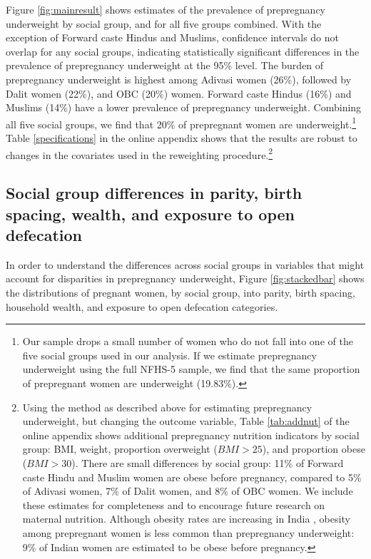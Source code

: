 \documentclass[12pt]{article}
\begin{document}
Figure \ref{fig:mainresult} shows estimates of the prevalence of prepregnancy underweight by social group, and for all five groups combined. With the exception of Forward caste Hindus and Muslims, confidence intervals do not overlap for any social groups, indicating statistically significant differences in the prevalence of prepregnancy underweight at the 95\% level. The burden of prepregnancy underweight is highest among Adivasi women (26\%), followed by Dalit women (22\%), and OBC (20\%) women.  Forward caste Hindus (16\%) and Muslims (14\%) have a lower prevalence of prepregnancy underweight. Combining all five social groups, we find that 20\% of prepregnant women are underweight.\footnote{Our sample drops a small number of women who do not fall into one of the five social groups used in our analysis.  If we estimate prepregnancy underweight using the full NFHS-5 sample, we find that the same proportion of prepregnant women are underweight (19.83\%).} Table \ref{specifications} in the online appendix shows that the results are robust to changes in the covariates used in the reweighting procedure.\footnote{Using the method as described above for estimating prepregnancy underweight, but changing the outcome variable, Table \ref{tab:addnut} of the online appendix shows additional prepregnancy nutrition indicators by social group: BMI, weight, proportion overweight ($BMI>25$), and proportion obese ($BMI>30$).  There are small differences by social group: 11\% of Forward caste Hindu and Muslim women are obese before pregnancy, compared to 5\% of Adivasi women, 7\% of Dalit women, and 8\% of OBC women.  We include these estimates for completeness and to encourage future research on maternal nutrition. Although obesity rates are increasing in India \citep{luhar2020forecasting}, obesity among prepregnant women is less common than prepregnancy underweight: 9\% of Indian women are estimated to be obese before pregnancy.}  

\subsection*{Social group differences in parity, birth spacing, wealth, and exposure to open defecation}

In order to understand the differences across social groups in variables that might account for disparities in prepregnancy underweight, Figure \ref{fig:stackedbar} shows the distributions of pregnant women, by social group, into parity, birth spacing, household wealth, and exposure to open defecation categories.
\end{document}
